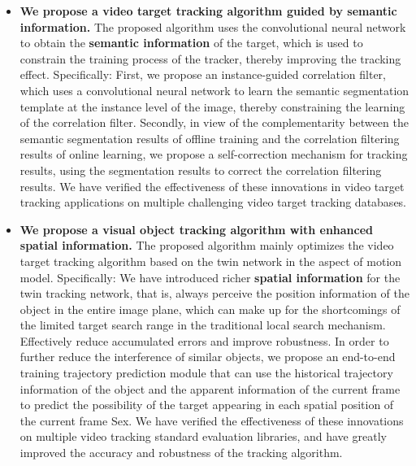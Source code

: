 \begin{itemize}
\item{\textbf{We propose a video target tracking algorithm guided by semantic information.} The proposed algorithm uses the convolutional neural network to obtain the \textbf{semantic information} of the target, which is used to constrain the training process of the tracker, thereby improving the tracking effect. Specifically: First, we propose an instance-guided correlation filter, which uses a convolutional neural network to learn the semantic segmentation template at the instance level of the image, thereby constraining the learning of the correlation filter. Secondly, in view of the complementarity between the semantic segmentation results of offline training and the correlation filtering results of online learning, we propose a self-correction mechanism for tracking results, using the segmentation results to correct the correlation filtering results. We have verified the effectiveness of these innovations in video target tracking applications on multiple challenging video target tracking databases.}

\item{\textbf{We propose a visual object tracking algorithm with enhanced spatial information.} The proposed algorithm mainly optimizes the video target tracking algorithm based on the twin network in the aspect of motion model. Specifically: We have introduced richer \textbf{spatial information} for the twin tracking network, that is, always perceive the position information of the object in the entire image plane, which can make up for the shortcomings of the limited target search range in the traditional local search mechanism. Effectively reduce accumulated errors and improve robustness. In order to further reduce the interference of similar objects, we propose an end-to-end training trajectory prediction module that can use the historical trajectory information of the object and the apparent information of the current frame to predict the possibility of the target appearing in each spatial position of the current frame Sex. We have verified the effectiveness of these innovations on multiple video tracking standard evaluation libraries, and have greatly improved the accuracy and robustness of the tracking algorithm.}


\end{itemize}
